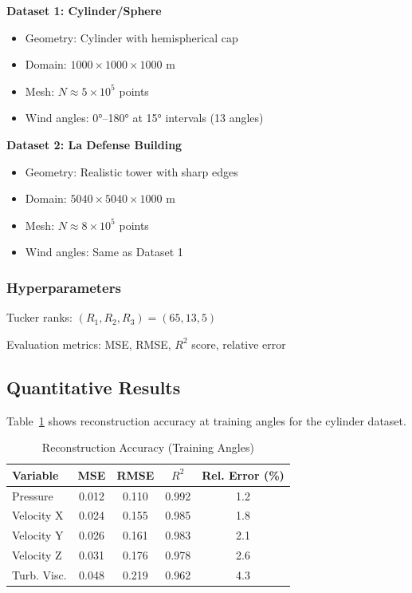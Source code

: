 \documentclass[conference]{IEEEtran}
\begin{document}
\textbf{Dataset 1: Cylinder/Sphere}
\begin{itemize}
    \item Geometry: Cylinder with hemispherical cap
    \item Domain: $1000 \times 1000 \times 1000$ m
    \item Mesh: $N \approx 5 \times 10^5$ points
    \item Wind angles: 0°--180° at 15° intervals (13 angles)
\end{itemize}

\textbf{Dataset 2: La Defense Building}
\begin{itemize}
    \item Geometry: Realistic tower with sharp edges
    \item Domain: $5040 \times 5040 \times 1000$ m
    \item Mesh: $N \approx 8 \times 10^5$ points
    \item Wind angles: Same as Dataset 1
\end{itemize}

\subsubsection{Hyperparameters}

Tucker ranks: $(R_1, R_2, R_3) = (65, 13, 5)$

Evaluation metrics: MSE, RMSE, $R^2$ score, relative error

\subsection{Quantitative Results}

Table~\ref{tab:reconstruction} shows reconstruction accuracy at training angles for the cylinder dataset.

\begin{table}[h]
\centering
\caption{Reconstruction Accuracy (Training Angles)}
\label{tab:reconstruction}
\begin{tabular}{@{}lcccc@{}}
\toprule
Variable & MSE & RMSE & $R^2$ & Rel. Error (\%) \\
\midrule
Pressure & 0.012 & 0.110 & 0.992 & 1.2 \\
Velocity X & 0.024 & 0.155 & 0.985 & 1.8 \\
Velocity Y & 0.026 & 0.161 & 0.983 & 2.1 \\
Velocity Z & 0.031 & 0.176 & 0.978 & 2.6 \\
Turb. Visc. & 0.048 & 0.219 & 0.962 & 4.3 \\
\bottomrule
\end{tabular}
\end{table}
\end{document}
